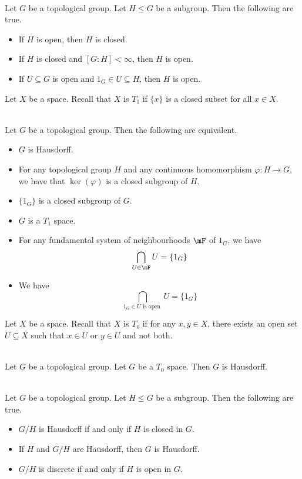 \documentclass[a4paper]{article}
\begin{document}
\begin{prp}{}{}\\
Let $G$ be a topological group. Let $H\leq G$ be a subgroup. Then the following are true. 
\begin{itemize}
\item If $H$ is open, then $H$ is closed. 
\item If $H$ is closed and $[G:H]<\infty$, then $H$ is open. 
\item If $U\subseteq G$ is open and $1_G\in U\subseteq H$, then $H$ is open. 
\end{itemize}
\end{prp}

Let $X$ be a space. Recall that $X$ is $T_1$ if $\{x\}$ is a closed subset for all $x\in X$. 

\begin{prp}{}{}\\
Let $G$ be a topological group. Then the following are equivalent. 
\begin{itemize}
\item $G$ is Hausdorff. 
\item For any topological group $H$ and any continuous homomorphism $\varphi:H\to G$, we have that $\ker(\varphi)$ is a closed subgroup of $H$. 
\item $\{1_G\}$ is a closed subgroup of $G$. 
\item $G$ is a $T_1$ space. 
\item For any fundamental system of neighbourhoods $\mF$ of $1_G$, we have $$\bigcap_{U\in\mF}U=\{1_G\}$$
\item We have $$\bigcap_{1_G\in U\text{ is open }}U=\{1_G\}$$
\end{itemize}
\end{prp}

Let $X$ be a space. Recall that $X$ is $T_0$ if for any $x,y\in X$, there exists an open set $U\subseteq X$ such that $x\in U$ or $y\in U$ and not both. 

\begin{prp}{}{}\\
Let $G$ be a topological group. Let $G$ be a $T_0$ space. Then $G$ is Hausdorff. 
\end{prp}

\begin{prp}{}{}\\
Let $G$ be a topological group. Let $H\leq G$ be a subgroup. Then the following are true. 
\begin{itemize}
\item $G/H$ is Hausdorff if and only if $H$ is closed in $G$. 
\item If $H$ and $G/H$ are Hausdorff, then $G$ is Hausdorff. 
\item $G/H$ is discrete if and only if $H$ is open in $G$. 
\end{itemize}
\end{prp}
\end{document}
